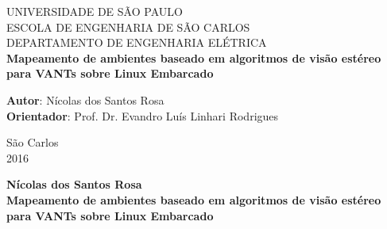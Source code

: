 \begin{titlepage}
	\begin{center}
		\Huge{UNIVERSIDADE DE SÃO PAULO}\\
		\vspace{0.02\textheight}
		\huge{ESCOLA DE ENGENHARIA DE SÃO CARLOS}\\
		\vspace{0.01\textheight}
		\huge{DEPARTAMENTO DE ENGENHARIA ELÉTRICA}\\
		\vspace{0.2\textheight}
		\huge{\textbf{Mapeamento de ambientes baseado em algoritmos de visão estéreo para VANTs sobre Linux Embarcado}}
		\vspace{0.2\textheight}
	\end{center}
		
		\large
		{
			\begin{flushleft}
			\Large{ \textbf{Autor}: \hspace{1cm} Nícolas dos Santos Rosa}\\
			\Large{ \textbf{Orientador}: \hspace{0.3cm} Prof. Dr. Evandro Luís Linhari Rodrigues }\\
			\end{flushleft}
	
			\begin{center}
				\vspace{0.09\textheight}
				\Large{São Carlos}\\
				\Large{2016}
			\end{center}
		}
	
\end{titlepage}


\cleardoublepage

	\begin{center}
	\vspace{-0.06\textheight}
		\Large{\textbf{Nícolas dos Santos Rosa}}\\
		\vspace{0.15\textheight}
		\Huge{\textbf{Mapeamento de ambientes baseado em algoritmos de visão estéreo para VANTs sobre Linux Embarcado}} 
		\vspace{0.08\textheight}
	\end{center}
		

